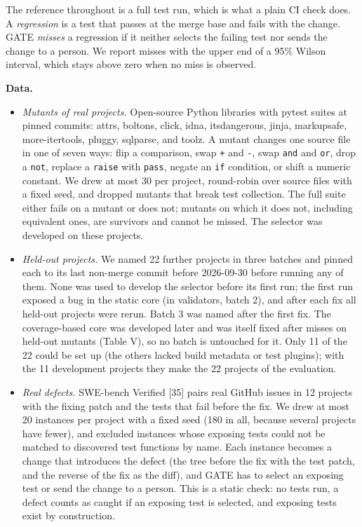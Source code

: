 \documentclass[conference]{IEEEtran}
\providecommand{\tightlist}{\setlength{\itemsep}{0pt}\setlength{\parskip}{0pt}}
\begin{document}
The reference throughout is a full test run, which is what a plain CI check does. A \emph{regression} is a test that passes at the merge base and fails with the change. GATE \emph{misses} a regression if it neither selects the failing test nor sends the change to a person. We report misses with the upper end of a 95\% Wilson interval, which stays above zero when no miss is observed.

\textbf{Data.}

\begin{itemize}
\tightlist
\item
  \emph{Mutants of real projects.} Open-source Python libraries with pytest suites at pinned commits: attrs, boltons, click, idna, itsdangerous, jinja, markupsafe, more-itertools, pluggy, sqlparse, and toolz. A mutant changes one source file in one of seven ways: flip a comparison, swap \texttt{+} and \texttt{-}, swap \texttt{and} and \texttt{or}, drop a \texttt{not}, replace a \texttt{raise} with \texttt{pass}, negate an \texttt{if} condition, or shift a numeric constant. We drew at most 30 per project, round-robin over source files with a fixed seed, and dropped mutants that break test collection. The full suite either fails on a mutant or does not; mutants on which it does not, including equivalent ones, are survivors and cannot be missed. The selector was developed on these projects.
\item
  \emph{Held-out projects.} We named 22 further projects in three batches and pinned each to its last non-merge commit before 2026-09-30 before running any of them. None was used to develop the selector before its first run; the first run exposed a bug in the static core (in validators, batch 2), and after each fix all held-out projects were rerun. Batch 3 was named after the first fix. The coverage-based core was developed later and was itself fixed after misses on held-out mutants (Table V), so no batch is untouched for it. Only 11 of the 22 could be set up (the others lacked build metadata or test plugins); with the 11 development projects they make the 22 projects of the evaluation.
\item
  \emph{Real defects.} SWE-bench Verified {[}35{]} pairs real GitHub issues in 12 projects with the fixing patch and the tests that fail before the fix. We drew at most 20 instances per project with a fixed seed (180 in all, because several projects have fewer), and excluded instances whose exposing tests could not be matched to discovered test functions by name. Each instance becomes a change that introduces the defect (the tree before the fix with the test patch, and the reverse of the fix as the diff), and GATE has to select an exposing test or send the change to a person. This is a static check: no tests run, a defect counts as caught if an exposing test is selected, and exposing tests exist by construction.

\end{itemize}
\end{document}
